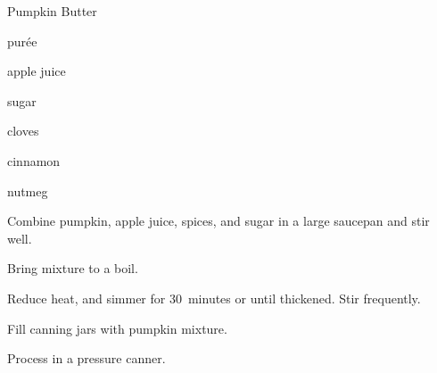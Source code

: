 \begin{recipe}{Pumpkin Butter}{}{}

\begin{ingredients}
\item \C{3\threequarter}  purée
\item \C{\threequarter} apple juice
\item \C{1\half} sugar
\item {} 
\item \tp{\half} cloves
\item {} cinnamon
\item {} nutmeg
\end{ingredients}

\begin{directions}
\item Combine pumpkin, apple juice, spices, and sugar in a large saucepan and stir well.
\item Bring mixture to a boil.
\item Reduce heat, and simmer for 30~minutes or until thickened. Stir frequently.
\item Fill canning jars with pumpkin mixture.
\item Process in a pressure canner.
\end{directions}

\end{recipe}
